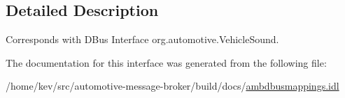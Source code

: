 \subsection{Detailed Description}
Corresponds with D\+Bus Interface org.\+automotive.\+Vehicle\+Sound. 

The documentation for this interface was generated from the following file\+:\begin{DoxyCompactItemize}
\item 
/home/kev/src/automotive-\/message-\/broker/build/docs/\hyperlink{ambdbusmappings_8idl}{ambdbusmappings.\+idl}\end{DoxyCompactItemize}
